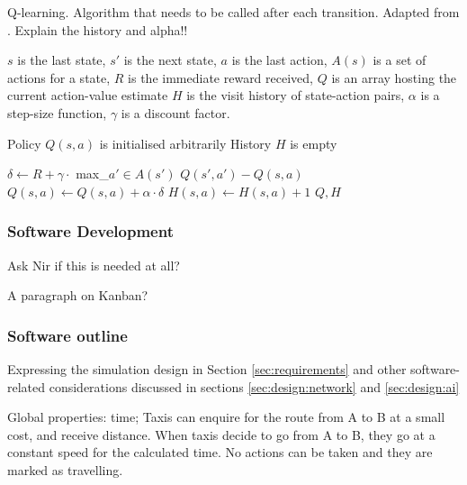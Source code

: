 \begin{algorithm}
  \caption{
  Q-learning. Algorithm that needs to be called after each transition. 
  Adapted from \textcite{Sutton1998ai+reinforcement}. Explain the history and alpha!!
  \label{algorithm:td:sarsa}}

  \begin{algorithmic}[1]
    \Require 
      \Statex $s$ is the last state,
      \Statex $s'$ is the next state,
      \Statex $a$ is the last action,
      \Statex $A(s)$ is a set of actions for a state,
      \Statex $R$ is the immediate reward received,
      \Statex $Q$ is an array hosting the current action-value estimate
      \Statex $H$ is the visit history of state-action pairs,
      \Statex $\alpha$ is a step-size function,
      \Statex $\gamma$ is a discount factor.

      \Statex Policy $Q(s, a)$ is initialised arbitrarily
      \Statex History $H$ is empty

      \State $\delta \gets R + 
              \gamma \cdot$ max\_{$a' \in A(s')$} $Q(s', a') - Q(s, a)$
      \State $Q(s, a) \gets Q(s, a) + \alpha \cdot \delta$
      \State $H(s, a) \gets H(s, a) + 1$
      \Return $Q, H$      
    \EndFunction
  \end{algorithmic}

\end{algorithm}


\subsubsection{Software Development}
Ask Nir if this is needed at all?

A paragraph on Kanban? \parencite{Anderson2010kanban}


\subsubsection{Software outline}
\label{sec:design:software}

Expressing the simulation design in Section \ref{sec:requirements} and
other software-related considerations discussed in sections
\ref{sec:design:network} and \ref{sec:design:ai}

Global properties: time; Taxis
can enquire for the route from A to B at a small cost, and receive distance.
When taxis decide to go from A to B, they go at a constant speed for the
calculated time. No actions can be taken and they are marked as travelling.


